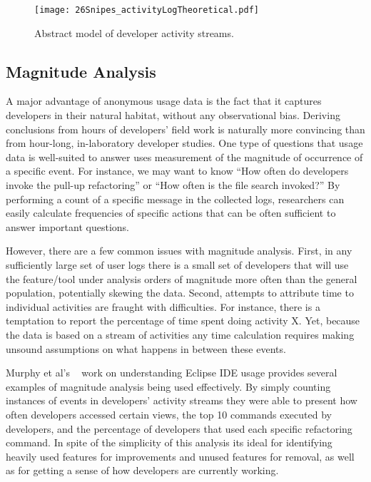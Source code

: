 \begin{figure*}[t]
 \centering
\texttt{[image: 26Snipes\_activityLogTheoretical.pdf]}
\caption{Abstract model of developer activity streams.}
\label{fig:theoretical}
\end{figure*}



\subsection{Magnitude Analysis}

A major advantage of anonymous usage data is the fact that it captures developers in their natural habitat, without any observational bias. Deriving conclusions from hours of developers' field work is naturally more convincing than from hour-long, in-laboratory developer studies. One type of questions that usage data is well-suited to answer uses measurement of the magnitude of occurrence of a specific event. For instance, we may want to know ``How often do developers invoke the pull-up refactoring'' or ``How often is the file search invoked?'' By performing a count of a specific message in the collected logs, researchers can easily calculate frequencies of specific actions that can be often sufficient to answer important questions. 

However, there are a few common issues with magnitude analysis. First, in any sufficiently large set of user logs there is a small set of developers that will use the feature/tool under analysis orders of magnitude more often than the general population, potentially skewing the data. 
Second, attempts to attribute time to individual activities are fraught with difficulties. For instance, there is a temptation to report the percentage of time spent doing activity X. Yet, because the data is based on a stream of activities any time calculation requires making unsound assumptions on what happens in between these events.

Murphy et al's ~\citet{V:Murphy2006How} work on understanding Eclipse IDE usage provides several examples of magnitude analysis being used effectively. By simply counting instances of events in developers' activity streams they were able to present how often developers accessed certain views, the top 10 commands executed by developers, and the percentage of developers that used each specific refactoring command. In spite of the simplicity of this analysis its ideal for identifying heavily used features for improvements and unused features for removal, as well as for getting a sense of how developers are currently working. 

